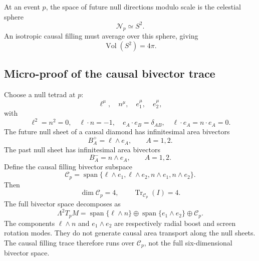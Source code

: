 \documentclass[11pt]{article}
\newcommand{\C}{\mathcal C}
\newcommand{\N}{\mathcal N}
\newcommand{\Vol}{\operatorname{Vol}}
\renewcommand{\Tr}{\operatorname{Tr}}
\newcommand{\Span}{\operatorname{span}}
\begin{document}
At an event $p$, the space of future null directions modulo scale is the celestial sphere
\begin{equation}
\N_p\simeq S^2.
\end{equation}
An isotropic causal filling must average over this sphere, giving
\begin{equation}
\Vol(S^2)=4\pi.
\end{equation}

\subsection{Micro-proof of the causal bivector trace}

Choose a null tetrad at $p$:
\begin{equation}
\ell^\mu,\quad n^\mu,\quad e_1^\mu,\quad e_2^\mu,
\end{equation}
with
\begin{equation}
\ell^2=n^2=0,
\quad \ell\cdot n=-1,
\quad e_A\cdot e_B=\delta_{AB},
\quad \ell\cdot e_A=n\cdot e_A=0.
\end{equation}
The future null sheet of a causal diamond has infinitesimal area bivectors
\begin{equation}
B_A^+=\ell\wedge e_A,
\qquad A=1,2.
\end{equation}
The past null sheet has infinitesimal area bivectors
\begin{equation}
B_A^-=n\wedge e_A,
\qquad A=1,2.
\end{equation}
Define the causal filling bivector subspace
\begin{equation}
\C_p=\Span\{\ell\wedge e_1,\ell\wedge e_2,n\wedge e_1,n\wedge e_2\}.
\end{equation}
Then
\begin{equation}
\boxed{\dim\C_p=4,
\qquad \Tr_{\C_p}(I)=4.}
\end{equation}
The full bivector space decomposes as
\begin{equation}
\Lambda^2T_pM=\Span\{\ell\wedge n\}\oplus\Span\{e_1\wedge e_2\}\oplus\C_p.
\end{equation}
The components $\ell\wedge n$ and $e_1\wedge e_2$ are respectively radial boost and screen rotation modes. They do not generate causal area transport along the null sheets. The causal filling trace therefore runs over $\C_p$, not the full six-dimensional bivector space.
\end{document}
